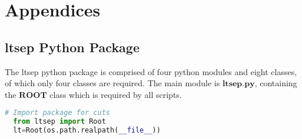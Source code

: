\chapter[Appendices]{Appendices}

%
%

\section{ltsep Python Package}
\label{appendix_A}

The ltsep python package is comprised of four python modules and eight classes, of which only four classes are required. The main module is $\textbf{ltsep.py}$, containing the $\textbf{ROOT}$ class which is required by all scripts.

\begin{lstlisting}[language=Python, caption={}, label={lst:call_ltsep}]
  # Import package for cuts
  from ltsep import Root  
  lt=Root(os.path.realpath(__file__))
\end{lstlisting}
